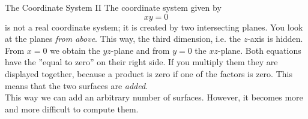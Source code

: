 \begin{surferPage}{The Coordinate System II}
The coordinate system given by 
\[xy=0\]
is not a real coordinate system; it is created by two intersecting planes. You look at the planes {\it from above}. This way, the third dimension, i.e. the $z$-axis is hidden. \\
\vspace{0.3cm}
From $x=0$ we obtain the $yz$-plane and from  $y=0$ the $xz$-plane.
Both equations have the ''equal to zero'' on their right side. If you multiply them they are displayed together, because a product is zero if one of the factors is zero. This means that the two surfaces are {\it added}. \\
This way we can add an arbitrary number of surfaces. However, it becomes more and more difficult to compute them.
\end{surferPage}

